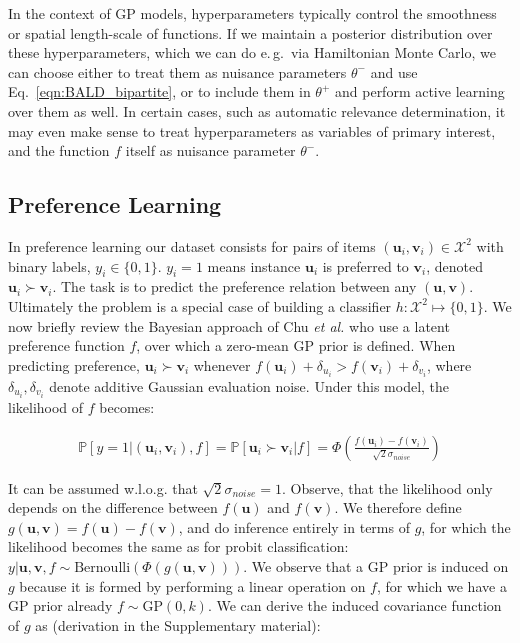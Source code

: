 \documentclass{article}
\newcommand{\upref}{\bm{u}}
\newcommand{\vpref}{\bm{v}}
\begin{document}
In the context of GP models, hyperparameters typically control the smoothness or spatial length-scale of functions. If we maintain a posterior distribution over these hyperparameters, which we can do e.\,g.\ via Hamiltonian Monte Carlo, we can choose either to treat them as nuisance parameters $\theta^-$ and use Eq.\ \ref{eqn:BALD_bipartite}, or to include them in $\theta^+$ and perform active learning over them as well. In certain cases, such as automatic relevance determination\cite{rasmussen2005}, it may even make sense to treat hyperparameters as variables of primary interest, and the function $f$ itself as nuisance parameter $\theta^-$.

\subsection{Preference Learning}

In preference learning our dataset consists for pairs of items $(\upref_i,\vpref_i)\in\mathcal{X}^2$ with binary labels, $y_i\in\{0,1\}$. $y_i=1$ means instance $\upref_i$ is preferred to $\vpref_i$, denoted $\upref_i\succ \vpref_i$. The task is to predict the preference relation between any $(\upref,\vpref)$. Ultimately the problem is a special case of building a classifier $h:\mathcal{X}^2\mapsto\{0,1\}$. We now briefly review the Bayesian approach of Chu \emph{et al.} \cite{chu2005} who use a latent preference function $f$, over which a zero-mean GP prior is defined. When predicting preference,  $\upref_i \succ \vpref_i$ whenever $f(\upref_i)+\delta_{u_i}>f(\vpref_i)+\delta_{v_i}$, where $\delta_{u_i}, \delta_{v_i}$ denote additive Gaussian evaluation noise. Under this model, the likelihood of $f$ becomes:

\begin{align}
	\mathbb{P}[y=1\vert (\upref_i,\vpref_i), f] = \mathbb{P}[\upref_i\succ \vpref_i \vert f] =  \Phi\left(\frac{f(\upref_i) - f(\vpref_i)}{\sqrt{2}\sigma_{noise}}\right)
\end{align}

It can be assumed w.l.o.g. that $\sqrt{2}\sigma_{noise}=1$. Observe, that the likelihood only depends on the difference between $f(\upref)$ and $f(\vpref)$. We therefore define $g(\upref,\vpref)=f(\upref)-f(\vpref)$, and do inference entirely in terms of $g$, for which the likelihood becomes the same as for probit classification: $y|\upref,\vpref,f\sim \mathrm{Bernoulli}(\Phi(g(\upref,\vpref)))$. We observe that a GP prior is induced on $g$ because it is formed by performing a linear operation on $f$, for which we have a GP prior already $f\sim \mathrm{GP}(0,k)$. We can derive the induced covariance function of $g$ as (derivation in the Supplementary material):
\end{document}
